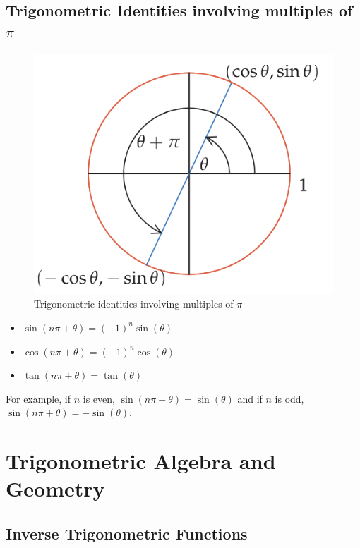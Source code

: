\subsection{Trigonometric Identities involving multiples of $\pi$}
\begin{figure}
    \centering
    \includegraphics[scale=0.5]{pics/16.png}
    \caption{Trigonometric identities involving multiples of $\pi$}
\end{figure}
\begin{itemize}
    \item $\sin(n\pi + \theta) = (-1)^n \sin(\theta)$
    \item $\cos(n\pi + \theta) = (-1)^n \cos(\theta)$
    \item $\tan(n\pi + \theta) = \tan(\theta)$
\end{itemize}
For example, if $n$ is even, $\sin(n\pi + \theta) = \sin(\theta)$ and if $n$ is odd, $\sin(n\pi + \theta) = -\sin(\theta)$.

\section{Trigonometric Algebra and Geometry}
\subsection{Inverse Trigonometric Functions}
